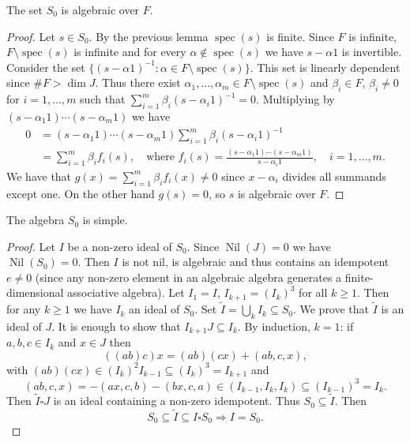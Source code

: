 \documentclass{article}
\begin{document}
\begin{lemma}
The set $S_0$ is algebraic over $F$.
\end{lemma}

\begin{proof}
Let $s \in S_0$. By the previous lemma $\operatorname{spec}(s)$ is finite. Since $F$ is infinite, $F \setminus \operatorname{spec}(s)$ is infinite and for every $\alpha \notin \operatorname{spec}(s)$ we have $s-\alpha 1$ is invertible.
Consider the set $\{(s-\alpha 1)^{-1} : \alpha \in F \setminus \operatorname{spec}(s)\}$.
This set is linearly dependent since $\#F > \dim J$. Thus there exist $\alpha_1,\dots,\alpha_m \in F \setminus \operatorname{spec}(s)$ and $\beta_i \in F$, $\beta_i \neq 0$ for $i=1,\dots,m$ such that $\sum_{i=1}^m \beta_i (s-\alpha_i 1)^{-1} = 0$.
Multiplying by $(s-\alpha_1 1)\cdots(s-\alpha_m 1)$ we have
\begin{align*}
0 &= (s-\alpha_1 1)\cdots(s-\alpha_m 1) \sum_{i=1}^m \beta_i (s-\alpha_i 1)^{-1} \\
&= \sum_{i=1}^m \beta_i f_i(s), \quad \text{where } f_i(s) = \frac{(s-\alpha_1 1)\cdots(s-\alpha_m 1)}{s-\alpha_i 1}, \quad i=1,\dots,m.
\end{align*}
We have that $g(x) = \sum_{i=1}^m \beta_i f_i(x) \neq 0$ since $x-\alpha_i$ divides all summands except one. On the other hand $g(s)=0$, so $s$ is algebraic over $F$.
\end{proof}

\begin{lemma}
The algebra $S_0$ is simple.
\end{lemma}

\begin{proof}
Let $I$ be a non-zero ideal of $S_0$. Since $\operatorname{Nil}(J)=0$ we have $\operatorname{Nil}(S_0)=0$. Then $I$ is not nil, is algebraic and thus contains an idempotent $e \neq 0$ (since any non-zero element in an algebraic algebra generates a finite-dimensional associative algebra).
Let $I_1 = I$, $I_{k+1} = (I_k)^3$ for all $k \geq 1$. Then for any $k \geq 1$ we have $I_k$ an ideal of $S_0$. Set $\widetilde{I} = \bigcup_k I_k \subseteq S_0$.
We prove that $\widetilde{I}$ is an ideal of $J$.
It is enough to show that $I_{k+1} J \subseteq I_k$.
By induction, $k=1$: if $a,b,c \in I_k$ and $x \in J$ then
\[
((ab)c)x = (ab)(cx) + (ab,c,x),
\]
with $(ab)(cx) \in (I_k)^2 I_{k-1} \subseteq (I_k)^3 = I_{k+1}$ and
\[
(ab,c,x) = -(ax,c,b) - (bx,c,a) \in (I_{k-1}, I_k, I_k) \subseteq (I_{k-1})^3 = I_k.
\]
Then $\widetilde{I} \square J$ is an ideal containing a non-zero idempotent. Thus $S_0 \subseteq \widetilde{I}$. Then
\[
S_0 \subseteq \widetilde{I} \subseteq I \square S_0 \Rightarrow I = S_0.
\]
\end{proof}
\end{document}
